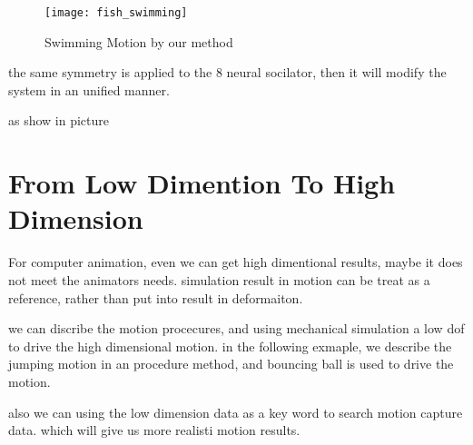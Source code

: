 \begin{figure}[!htbp]
  \begin{center}
      \texttt{[image: fish\_swimming]}
    \caption{Swimming Motion by our method}
    \label{fig:fishswimming}
\end{center}
\end{figure}




the same symmetry is applied to the 8 neural socilator, then it will modify the system in an unified manner.

as show in picture



\section{From Low Dimention To High Dimension}

For computer animation, even we can get high dimentional results, maybe it does not meet the animators needs.
simulation result in motion can be treat as a reference, rather than put into result in deformaiton.

we can discribe the motion procecures, and using mechanical simulation a low dof to drive the high dimensional motion.
in the following exmaple,
we describe the jumping motion in an procedure method,
and bouncing ball is used to drive the motion.


also we can using the low dimension data as a key word to search motion capture data.
which will give us more realisti motion results.


